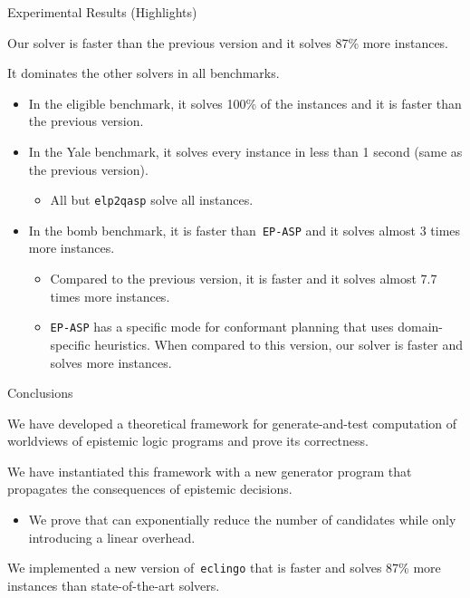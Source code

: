 \documentclass[aspectratio=169,svgnames,xcolor=table,t]{beamer}
\begin{document}
\begin{frame}{Experimental Results (Highlights)}
    \begin{myitemize}
        \item Our solver is  faster than the previous version and it solves 87\% more instances.
        \item It dominates the other solvers in all benchmarks.
        \begin{itemize}
            \item In the eligible benchmark, it solves 100\% of the instances and it is  faster than the previous version.
            
            \item In the Yale benchmark, it solves every instance in less than 1 second (same as the previous version).
            \begin{itemize}
                \item All but \texttt{elp2qasp} solve all instances.
            \end{itemize}
            
            \item In the bomb benchmark, it is  faster than~\texttt{EP-ASP} and it solves almost 3 times more instances.
            \begin{itemize}
                \item Compared to the previous version, it is  faster and it solves almost 7.7 times more instances.
                \item \texttt{EP-ASP} has a specific mode for conformant planning that uses domain-specific heuristics. When compared to this version, our solver is  faster and solves  more instances.
            \end{itemize}
        \end{itemize}
    \end{myitemize}
\end{frame}
\begin{frame}{Conclusions}
    \begin{myitemize}
        \item We have developed a theoretical framework for generate-and-test computation of worldviews of epistemic logic programs and prove its correctness.
        
        \item We have instantiated this framework with a new generator program that propagates the consequences of epistemic decisions.
        \begin{itemize}
            \item We prove that can exponentially reduce the number of candidates while only introducing a linear overhead. 
        \end{itemize}

        \item We implemented a new version of~\texttt{eclingo} that is  faster and solves 87\% more instances than state-of-the-art solvers.
    \end{myitemize}
\end{frame}
\frame{\backcoverpage}
\end{document}
